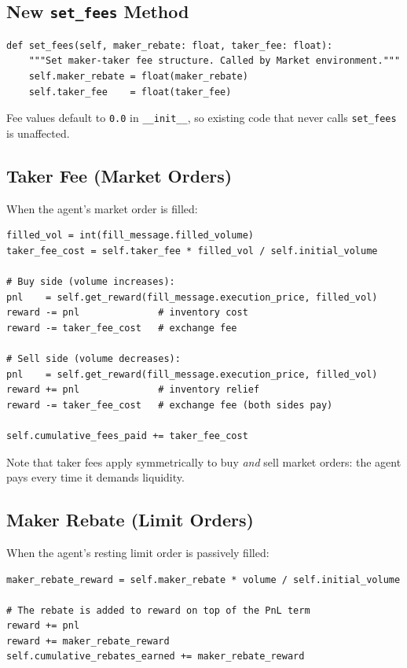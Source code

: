 \documentclass[11pt,a4paper]{article}
\begin{document}
\subsection{New \texttt{set\_fees} Method}

\begin{lstlisting}
def set_fees(self, maker_rebate: float, taker_fee: float):
    """Set maker-taker fee structure. Called by Market environment."""
    self.maker_rebate = float(maker_rebate)
    self.taker_fee    = float(taker_fee)
\end{lstlisting}

Fee values default to \texttt{0.0} in \texttt{\_\_init\_\_}, so existing
code that never calls \texttt{set\_fees} is unaffected.

\subsection{Taker Fee (Market Orders)}

When the agent's market order is filled:

\begin{lstlisting}
filled_vol = int(fill_message.filled_volume)
taker_fee_cost = self.taker_fee * filled_vol / self.initial_volume

# Buy side (volume increases):
pnl    = self.get_reward(fill_message.execution_price, filled_vol)
reward -= pnl              # inventory cost
reward -= taker_fee_cost   # exchange fee

# Sell side (volume decreases):
pnl    = self.get_reward(fill_message.execution_price, filled_vol)
reward += pnl              # inventory relief
reward -= taker_fee_cost   # exchange fee (both sides pay)

self.cumulative_fees_paid += taker_fee_cost
\end{lstlisting}

Note that taker fees apply symmetrically to buy \emph{and} sell market
orders: the agent pays every time it demands liquidity.

\subsection{Maker Rebate (Limit Orders)}

When the agent's resting limit order is passively filled:

\begin{lstlisting}
maker_rebate_reward = self.maker_rebate * volume / self.initial_volume

# The rebate is added to reward on top of the PnL term
reward += pnl
reward += maker_rebate_reward
self.cumulative_rebates_earned += maker_rebate_reward
\end{lstlisting}
\end{document}
